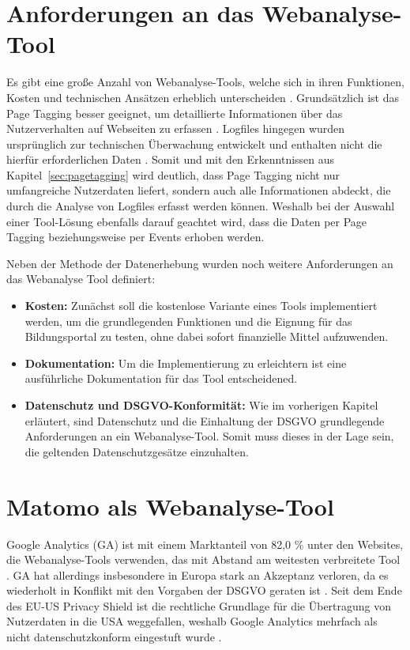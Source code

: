 \section{Anforderungen an das Webanalyse-Tool}
\label{sec:anforderungenWebanalyseTool}
Es gibt eine große Anzahl von Webanalyse-Tools, welche sich in ihren Funktionen, Kosten und technischen Ansätzen erheblich unterscheiden \parencite[S.244]{Rittgerberger2016}. Grundsätzlich ist das Page Tagging besser geeignet, um detaillierte Informationen über das Nutzerverhalten auf Webseiten zu erfassen \parencite[Kap.2.5.3]{Hassler2019}. Logfiles hingegen wurden ursprünglich zur technischen Überwachung entwickelt und enthalten nicht die hierfür erforderlichen Daten \parencite[Kap.2.5.3]{Hassler2019}. Somit und mit den Erkenntnissen aus Kapitel~\ref{sec:pagetagging} wird deutlich, dass Page Tagging nicht nur umfangreiche Nutzerdaten liefert, sondern auch alle Informationen abdeckt, die durch die Analyse von Logfiles erfasst werden können. Weshalb bei der Auswahl einer Tool-Lösung ebenfalls darauf geachtet wird, dass die Daten per Page Tagging beziehungsweise per Events erhoben werden.

Neben der Methode der Datenerhebung wurden noch weitere Anforderungen an das Webanalyse Tool definiert:

\begin{itemize}
    \item \textbf{Kosten:} Zunächst soll die kostenlose Variante eines Tools implementiert werden, um die grundlegenden Funktionen und die Eignung für das Bildungsportal zu testen, ohne dabei sofort finanzielle Mittel aufzuwenden.
    \item \textbf{Dokumentation:} Um die Implementierung zu erleichtern ist eine ausführliche Dokumentation für das Tool entscheidened.
    \item \textbf{Datenschutz und DSGVO-Konformität:} Wie im vorherigen Kapitel erläutert, sind Datenschutz und die Einhaltung der DSGVO grundlegende Anforderungen an ein Webanalyse-Tool. Somit muss dieses in der Lage sein, die geltenden Datenschutzgesätze einzuhalten.
\end{itemize}

\section{Matomo als Webanalyse-Tool}
Google Analytics (GA) ist mit einem Marktanteil von 82,0 \% unter den Websites, die Webanalyse-Tools verwenden, das mit Abstand am weitesten verbreitete Tool \parencite{W3Techs2025}. GA hat allerdings insbesondere in Europa stark an Akzeptanz verloren, da es wiederholt in Konflikt mit den Vorgaben der DSGVO geraten ist \parencite{Förster2024}. Seit dem Ende des EU-US Privacy Shield ist die rechtliche Grundlage für die Übertragung von Nutzerdaten in die USA weggefallen, weshalb Google Analytics mehrfach als nicht datenschutzkonform eingestuft wurde \parencite{Förster2024}.

